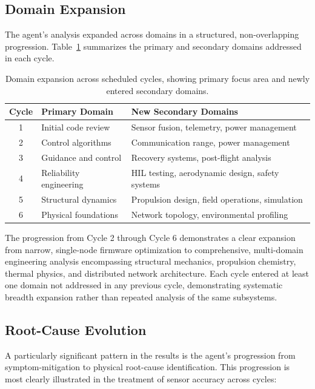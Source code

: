 \documentclass[11pt,letterpaper]{article}
\begin{document}
\subsection{Domain Expansion}

The agent's analysis expanded across domains in a structured, non-overlapping progression. Table~\ref{tab:domain-expansion} summarizes the primary and secondary domains addressed in each cycle.

\begin{table}[htbp]
\centering
\caption{Domain expansion across scheduled cycles, showing primary focus area and newly entered secondary domains.}
\label{tab:domain-expansion}
\begin{tabular}{cll}
\toprule
\textbf{Cycle} & \textbf{Primary Domain} & \textbf{New Secondary Domains} \\
\midrule
1 & Initial code review & Sensor fusion, telemetry, power management \\
2 & Control algorithms & Communication range, power management \\
3 & Guidance and control & Recovery systems, post-flight analysis \\
4 & Reliability engineering & HIL testing, aerodynamic design, safety systems \\
5 & Structural dynamics & Propulsion design, field operations, simulation \\
6 & Physical foundations & Network topology, environmental profiling \\
\bottomrule
\end{tabular}
\end{table}

The progression from Cycle 2 through Cycle 6 demonstrates a clear expansion from narrow, single-node firmware optimization to comprehensive, multi-domain engineering analysis encompassing structural mechanics, propulsion chemistry, thermal physics, and distributed network architecture. Each cycle entered at least one domain not addressed in any previous cycle, demonstrating systematic breadth expansion rather than repeated analysis of the same subsystems.

\subsection{Root-Cause Evolution}

A particularly significant pattern in the results is the agent's progression from symptom-mitigation to physical root-cause identification. This progression is most clearly illustrated in the treatment of sensor accuracy across cycles:
\end{document}
